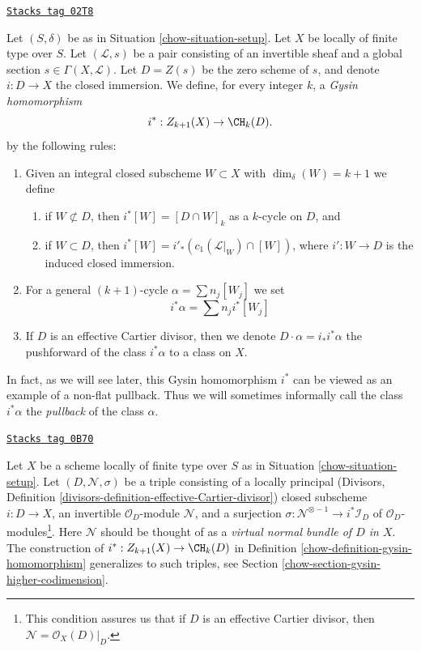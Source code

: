 \begin{definition}
\label{chow-definition-gysin-homomorphism}
\href{https://stacks.math.columbia.edu/tag/02T8}{\texttt{Stacks tag 02T8}}

Let $(S, \delta)$ be as in Situation \ref{chow-situation-setup}.
Let $X$ be locally of finite type over $S$.
Let $(\mathcal{L}, s)$ be a pair consisting of an invertible
sheaf and a global section $s \in \Gamma(X, \mathcal{L})$.
Let $D = Z(s)$ be the zero scheme of $s$, and
denote $i : D \to X$ the closed immersion.
We define, for every integer $k$, a {\it Gysin homomorphism}
$$
i^* : Z_{k + 1}(X) \to \CH_k(D).
$$
by the following rules:
\begin{enumerate}
\item Given an integral closed subscheme $W \subset X$ with
$\dim_\delta(W) = k + 1$ we define
\begin{enumerate}
\item if $W \not \subset D$, then $i^*[W] = [D \cap W]_k$ as a
$k$-cycle on $D$, and
\item if $W \subset D$, then
$i^*[W] = i'_*(c_1(\mathcal{L}|_W) \cap [W])$,
where $i' : W \to D$ is the induced closed immersion.
\end{enumerate}
\item For a general $(k + 1)$-cycle $\alpha = \sum n_j[W_j]$
we set
$$
i^*\alpha = \sum n_j i^*[W_j]
$$
\item If $D$ is an effective Cartier divisor, then we denote
$D \cdot \alpha = i_*i^*\alpha$ the pushforward of the class $i^*\alpha$
to a class on $X$.
\end{enumerate}
\end{definition}

In fact, as we will see later, this Gysin homomorphism $i^*$ can be viewed
as an example of a non-flat pullback. Thus we will sometimes informally
call the class $i^*\alpha$ the {\it pullback} of the class $\alpha$.

\begin{remark}
\label{chow-remark-generalize-to-virtual}
\href{https://stacks.math.columbia.edu/tag/0B70}{\texttt{Stacks tag 0B70}}

Let $X$ be a scheme locally of finite type over $S$ as in
Situation \ref{chow-situation-setup}. Let $(D, \mathcal{N}, \sigma)$
be a triple consisting of a locally principal (Divisors, Definition
\ref{divisors-definition-effective-Cartier-divisor}) closed subscheme
$i : D \to X$, an invertible $\mathcal{O}_D$-module $\mathcal{N}$, and
a surjection $\sigma : \mathcal{N}^{\otimes -1} \to i^*\mathcal{I}_D$
of $\mathcal{O}_D$-modules\footnote{This condition assures us that if
$D$ is an effective Cartier divisor, then $\mathcal{N} = \mathcal{O}_X(D)|_D$.}.
Here $\mathcal{N}$ should be thought of as
a {\it virtual normal bundle of $D$ in $X$}. The construction of
$i^* : Z_{k + 1}(X) \to \CH_k(D)$ in
Definition \ref{chow-definition-gysin-homomorphism}
generalizes to such triples, see
Section \ref{chow-section-gysin-higher-codimension}.
\end{remark}

